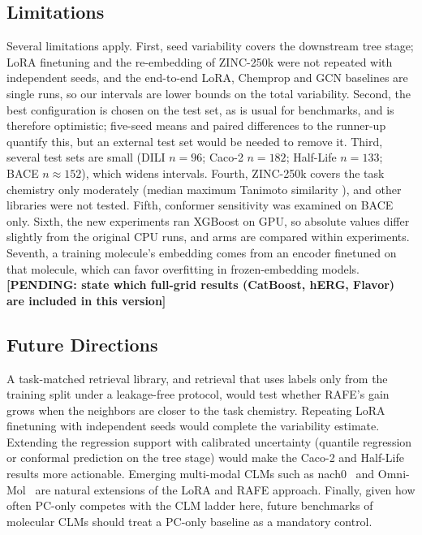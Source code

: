 \documentclass[pdflatex,sn-mathphys-num]{sn-jnl}%
\newcommand{\pending}[1]{{\color{red}\textbf{[PENDING: #1]}}}%
\begin{document}
\subsection{Limitations}\label{sec:limitations}
Several limitations apply. First, seed variability covers the downstream tree stage; LoRA finetuning and the re-embedding of ZINC-250k were not repeated with independent seeds, and the end-to-end LoRA, Chemprop and GCN baselines are single runs, so our intervals are lower bounds on the total variability. Second, the best configuration is chosen on the test set, as is usual for benchmarks, and is therefore optimistic; five-seed means and paired differences to the runner-up quantify this, but an external test set would be needed to remove it. Third, several test sets are small (DILI $n=96$; Caco-2 $n=182$; Half-Life $n=133$; BACE $n\approx152$), which widens intervals. Fourth, ZINC-250k covers the task chemistry only moderately (median maximum Tanimoto similarity \covmedian{}), and other libraries were not tested. Fifth, conformer sensitivity was examined on BACE only. Sixth, the new experiments ran XGBoost on GPU, so absolute values differ slightly from the original CPU runs, and arms are compared within experiments. Seventh, a training molecule's embedding comes from an encoder finetuned on that molecule, which can favor overfitting in frozen-embedding models. \pending{state which full-grid results (CatBoost, hERG, Flavor) are included in this version}

\subsection{Future Directions}\label{sec:future_work}
A task-matched retrieval library, and retrieval that uses labels only from the training split under a leakage-free protocol, would test whether RAFE's gain grows when the neighbors are closer to the task chemistry. Repeating LoRA finetuning with independent seeds would complete the variability estimate. Extending the regression support with calibrated uncertainty (quantile regression or conformal prediction on the tree stage) would make the Caco-2 and Half-Life results more actionable. Emerging multi-modal CLMs such as nach0~\cite{livne2024nach0} and Omni-Mol~\cite{hu2025omnimol} are natural extensions of the LoRA and RAFE approach. Finally, given how often PC-only competes with the CLM ladder here, future benchmarks of molecular CLMs should treat a PC-only baseline as a mandatory control.

\end{document}

